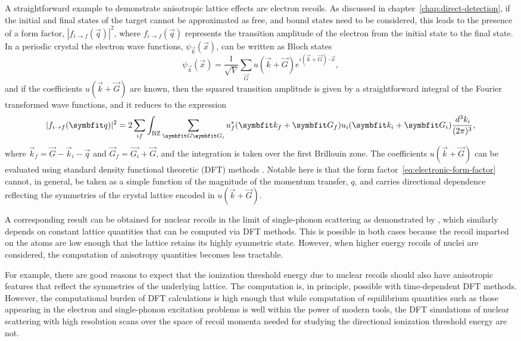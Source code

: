 A straightforward example to demonstrate anisotropic lattice effects are electron recoils. As discussed in chapter~\ref{chap:direct-detection}, if the initial and final states of the target cannot be approximated as free, and bound states need to be considered, this leads to the presence of a form factor, $|f_{i\rightarrow f}(\vec{q})|^2$, where $f_{i\rightarrow f}(\vec{q})$ represents the transition amplitude of the electron from the initial state to the final state. In a periodic crystal the electron wave functions, $\psi_{\vec{k}}(\vec{x})$, can be written as Bloch states
\begin{equation}
    \psi_{\vec{k}}(\vec{x})=\frac{1}{\sqrt{V}}\sum_{\vec{G}}u(\vec{k}+\vec{G})e^{i(\vec{k}+\vec{G})\cdot\vec{x}},
\end{equation}
and if the coefficients $u(\vec{k}+\vec{G})$ are known, then the squared transition amplitude is given by a straightforward integral of the Fourier transformed wave functions, and it reduces to the expression
\begin{equation}
    |f_{i\rightarrow f}(\vec{q})|^2=2\sum_{if}\int_\text{BZ}\sum_{\vec{G}\vec{G}_i}u_f^*(\vec{k}_f+\vec{G}_f)u_i(\vec{k}_i+\vec{G}_i)\frac{\difd^3 k_i}{(2\pi)^3},
    \label{eq:electronic-form-factor}
\end{equation}
where $\vec{k}_f=\vec{G}-\vec{k}_i-\vec{q}$ and $\vec{G}_f=\vec{G_i}+\vec{G}$, and the integration is taken over the first Brillouin zone. The coefficients $u(\vec{k}+\vec{G})$ can be evaluated using standard density functional theoretic (DFT) methods \parencite{EssigEtAl2015}. Notable here is that the form factor~\eqref{eq:electronic-form-factor} cannot, in general, be taken as a simple function of the magnitude of the momentum transfer, $q$, and carries directional dependence reflecting the symmetries of the crystal lattice encoded in $u(\vec{k}+\vec{G})$.

A corresponding result can be obtained for nuclear recoils in the limit of single-phonon scattering as demonstrated by \textcite{TrickleEtAl2020}, which similarly depends on constant lattice quantities that can be computed via DFT methods. This is possible in both cases because the recoil imparted on the atoms are low enough that the lattice retains its highly symmetric state. However, when higher energy recoils of nuclei are considered, the computation of anisotropy quantities becomes less tractable.

For example, there are good reasons to expect that the ionization threshold energy due to nuclear recoils should also have anisotropic features that reflect the symmetries of the underlying lattice. The computation is, in principle, possible with time-dependent DFT methods. However, the computational burden of DFT calculations is high enough that while computation of equilibrium quantities such as those appearing in the electron and single-phonon excitation problems is well within the power of modern tools, the DFT simulations of nuclear scattering with high resolution scans over the space of recoil momenta needed for studying the directional ionization threshold energy are not.

